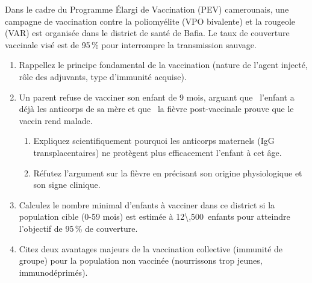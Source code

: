 \documentclass[11pt]{article}
\begin{document}
\begin{exercice}
Dans le cadre du Programme Élargi de Vaccination (PEV) camerounais, une campagne de vaccination contre la poliomyélite (VPO bivalente) et la rougeole (VAR) est organisée dans le district de santé de Bafia. Le taux de couverture vaccinale visé est de 95\,\% pour interrompre la transmission sauvage.

\begin{enumerate}
    \item Rappellez le principe fondamental de la vaccination (nature de l'agent injecté, rôle des adjuvants, type d'immunité acquise).
    \item Un parent refuse de vacciner son enfant de 9 mois, arguant que \og\ l'enfant a déjà les anticorps de sa mère\fg{} et que \og\ la fièvre post-vaccinale prouve que le vaccin rend malade\fg{}. 
    \begin{enumerate}
        \item Expliquez scientifiquement pourquoi les anticorps maternels (IgG transplacentaires) ne protègent plus efficacement l'enfant à cet âge.
        \item Réfutez l'argument sur la fièvre en précisant son origine physiologique et son signe clinique.
    \end{enumerate}
    \item Calculez le nombre minimal d'enfants à vacciner dans ce district si la population cible (0-59 mois) est estimée à \SI{12\,500}{enfants} pour atteindre l'objectif de 95\,\% de couverture.
    \item Citez deux avantages majeurs de la vaccination collective (immunité de groupe) pour la population non vaccinée (nourrissons trop jeunes, immunodéprimés).
\end{enumerate}
\end{exercice}
\end{document}
